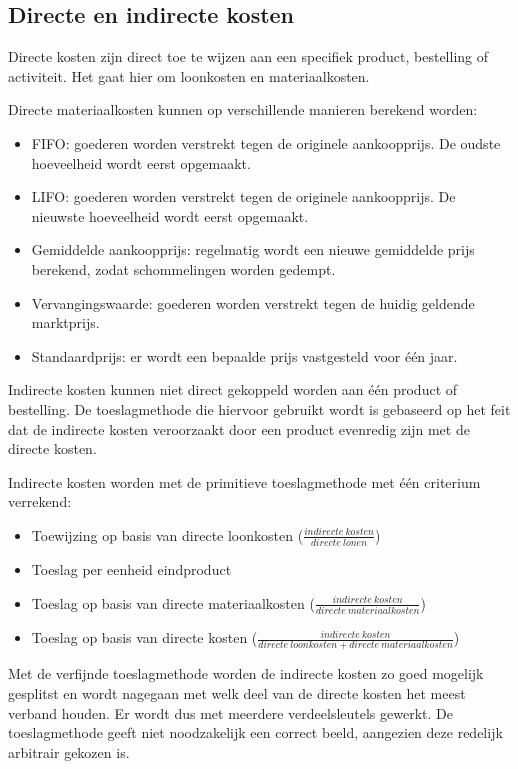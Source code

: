 \documentclass[../../samenvatting.tex]{subfiles}
\begin{document}
\subsection{Directe en indirecte kosten}
Directe kosten zijn direct toe te wijzen aan een specifiek product, bestelling of activiteit. Het gaat hier om loonkosten en materiaalkosten.

Directe materiaalkosten kunnen op verschillende manieren berekend worden:
\begin{itemize}
    \item FIFO: goederen worden verstrekt tegen de originele aankoopprijs. De oudste hoeveelheid wordt eerst opgemaakt.
    \item LIFO: goederen worden verstrekt tegen de originele aankoopprijs. De nieuwste hoeveelheid wordt eerst opgemaakt.
    \item Gemiddelde aankoopprijs: regelmatig wordt een nieuwe gemiddelde prijs berekend, zodat schommelingen worden gedempt.
    \item Vervangingswaarde: goederen worden verstrekt tegen de huidig geldende marktprijs.
    \item Standaardprijs: er wordt een bepaalde prijs vastgesteld voor één jaar.
\end{itemize}

Indirecte kosten kunnen niet direct gekoppeld worden aan één product of bestelling. De toeslagmethode die hiervoor gebruikt wordt is gebaseerd op het feit dat de indirecte kosten veroorzaakt door een product evenredig zijn met de directe kosten.

Indirecte kosten worden met de primitieve toeslagmethode met één criterium verrekend:
\begin{itemize}
    \item Toewijzing op basis van directe loonkosten ($\frac{indirecte\ kosten}{directe\ lonen}$)
    \item Toeslag per eenheid eindproduct
    \item Toeslag op basis van directe materiaalkosten ($\frac{indirecte\ kosten}{directe\ materiaalkosten}$)
    \item Toeslag op basis van directe kosten ($\frac{indirecte\ kosten}{directe\ loonkosten + directe\ materiaalkosten}$)
\end{itemize}

Met de verfijnde toeslagmethode worden de indirecte kosten zo goed mogelijk gesplitst en wordt nagegaan met welk deel van de directe kosten het meest verband houden. Er wordt dus met meerdere verdeelsleutels gewerkt. De toeslagmethode geeft niet noodzakelijk een correct beeld, aangezien deze redelijk arbitrair gekozen is.
\end{document}
